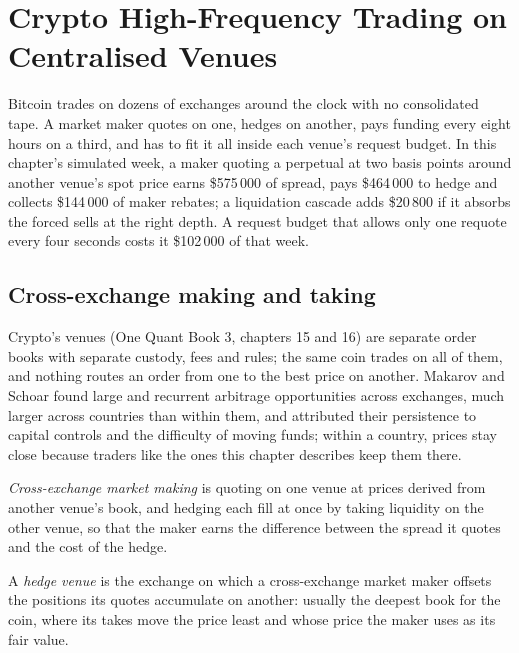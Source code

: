 \chapter{Crypto High-Frequency Trading on Centralised Venues}\label{ch:hf:crypto-high-frequency-trading-on-centralised-venues}

Bitcoin trades on dozens of exchanges around the clock with no consolidated tape. A market maker quotes on one, hedges on another, pays funding
every eight hours on a third, and has to fit it all inside each venue's request budget. In this chapter's simulated week, a maker quoting a
perpetual at two basis points around another venue's spot price earns \$575\,000 of spread, pays \$464\,000 to hedge and collects \$144\,000 of maker
rebates; a liquidation cascade adds \$20\,800 if it absorbs the forced sells at the right depth. A request budget that allows only one requote every
four seconds costs it \$102\,000 of that week.

\section{Cross-exchange making and taking}

Crypto's venues (One Quant Book 3, chapters 15 and 16) are separate order books with separate custody, fees and rules; the same coin trades on all
of them, and nothing routes an order from one to the best price on another. Makarov and Schoar found large and recurrent arbitrage opportunities
across exchanges, much larger across countries than within them, and attributed their persistence to capital controls and the difficulty of moving
funds; within a country, prices stay close because traders like the ones this chapter describes keep them there.

\begin{definition}\label{def:hf:crypto-high-frequency-trading-on-centralised-venues:xmm}
\emph{Cross-exchange market making} is quoting on one venue at prices derived from another venue's book, and
hedging each fill at once by taking liquidity on the other venue, so that the maker earns the difference between the spread it quotes and the cost of
the hedge.
\end{definition}

\begin{definition}\label{def:hf:crypto-high-frequency-trading-on-centralised-venues:hedge}
A \emph{hedge venue} is the exchange on which a cross-exchange market maker offsets the positions its quotes accumulate on
another: usually the deepest book for the coin, where its takes move the price least and whose price the maker uses as its fair value.
\end{definition}

